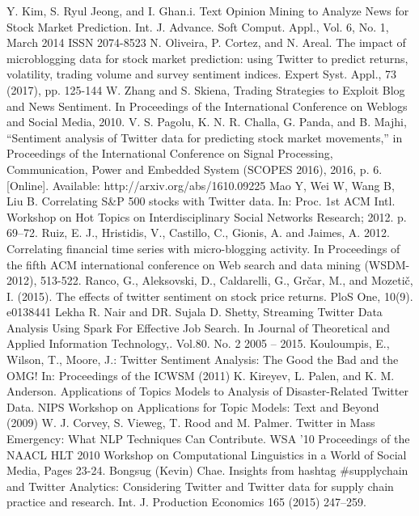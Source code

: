 \documentclass[conference]{IEEEtran}
\begin{document}
\begin{thebibliography}{00}
 Y. Kim, S. Ryul Jeong, and I. Ghan.i. Text Opinion Mining to Analyze News for Stock Market Prediction. Int. J. Advance. Soft Comput. Appl., Vol. 6, No. 1, March 2014 ISSN 2074-8523
 N. Oliveira, P. Cortez, and N. Areal. The impact of microblogging data for stock market prediction: using Twitter to predict returns, volatility, trading volume and survey sentiment indices. Expert Syst. Appl., 73 (2017), pp. 125-144
 W. Zhang and S. Skiena, Trading Strategies to Exploit Blog and News Sentiment. In Proceedings of the International Conference on Weblogs and Social Media, 2010.
 V. S. Pagolu, K. N. R. Challa, G. Panda, and B. Majhi, “Sentiment analysis of Twitter data for predicting stock market movements,” in Proceedings of the International Conference on Signal Processing, Communication, Power and Embedded System (SCOPES 2016), 2016, p. 6. [Online]. Available: http://arxiv.org/abs/1610.09225
 Mao Y, Wei W, Wang B, Liu B. Correlating S\&P 500 stocks with Twitter data. In: Proc. 1st ACM Intl. Workshop on Hot Topics on Interdisciplinary Social Networks Research; 2012. p. 69–72.
 Ruiz, E. J., Hristidis, V., Castillo, C., Gionis, A. and Jaimes, A. 2012. Correlating financial time series with micro-blogging activity. In Proceedings of the fifth ACM international conference on Web search and data mining (WSDM-2012), 513-522.
 Ranco, G., Aleksovski, D., Caldarelli, G., Grčar, M., and Mozetič, I. (2015). The effects of twitter sentiment on stock price returns. PloS One, 10(9). e0138441
 Lekha R. Nair and DR. Sujala D. Shetty, Streaming Twitter Data Analysis Using Spark For Effective Job Search. In Journal of Theoretical and Applied Information Technology,. Vol.80. No. 2 2005 – 2015.
 Kouloumpis, E., Wilson, T., Moore, J.: Twitter Sentiment Analysis: The Good the Bad and the OMG! In: Proceedings of the ICWSM (2011)
 K. Kireyev, L. Palen, and K. M. Anderson. Applications of Topics Models to Analysis of Disaster-Related Twitter Data. NIPS Workshop on Applications for Topic Models: Text and Beyond (2009)
 W. J. Corvey, S. Vieweg, T. Rood and M. Palmer. Twitter in Mass Emergency: What NLP Techniques Can Contribute. WSA '10 Proceedings of the NAACL HLT 2010 Workshop on Computational Linguistics in a World of Social Media, Pages 23-24.
 Bongsug (Kevin) Chae. Insights from hashtag \#supplychain and Twitter Analytics: Considering Twitter and Twitter data for supply chain practice and research. Int. J. Production Economics 165 (2015) 247–259.

\end{thebibliography}
\end{document}

